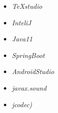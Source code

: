 \begin{itemize}
	\item \textit{TeXstudio}
	\item \textit{InteliJ}
	\item \textit{Java11}
	\item \textit{SpringBoot}
	\item \textit{AndroidStudio}
	\item \textit{javax.sound}
	\item \textit{jcodec)}
\end{itemize}
